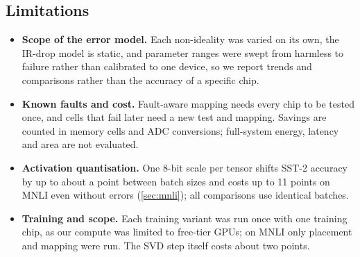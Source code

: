 \subsection{Limitations}
\begin{itemize}
\item \textbf{Scope of the error model.} Each non-ideality was varied on its own, the IR-drop model is
static, and parameter ranges were swept from harmless to failure rather than calibrated to one device, so
we report trends and comparisons rather than the accuracy of a specific chip.
\item \textbf{Known faults and cost.} Fault-aware mapping needs every chip to be tested once, and cells
that fail later need a new test and mapping. Savings are counted in memory cells and ADC conversions;
full-system energy, latency and area are not evaluated.
\item \textbf{Activation quantisation.} One 8-bit scale per tensor shifts SST-2 accuracy by up to about a
point between batch sizes and costs up to 11 points on MNLI even without errors (\cref{sec:mnli}); all
comparisons use identical batches.
\item \textbf{Training and scope.} Each training variant was run once with one training chip, as our
compute was limited to free-tier GPUs; on MNLI only placement and mapping were run. The SVD step itself costs about two points.
\end{itemize}
